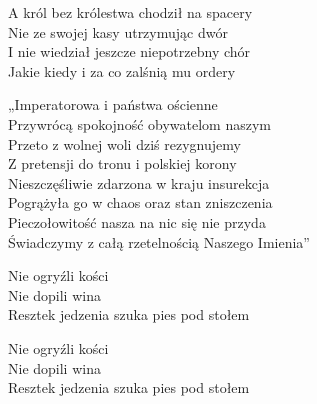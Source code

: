 \begin{text}
    \vin A król bez królestwa chodził na spacery\\
    \vin Nie ze swojej kasy utrzymując dwór\\
    \vin I nie wiedział jeszcze niepotrzebny chór\\
    \vin Jakie kiedy i za co zalśnią mu ordery

    „Imperatorowa i państwa ościenne\\
    Przywrócą spokojność obywatelom naszym\\
    Przeto z wolnej woli dziś rezygnujemy\\
    Z pretensji do tronu i polskiej korony\\
    Nieszczęśliwie zdarzona w kraju insurekcja\\
    Pogrążyła go w chaos oraz stan zniszczenia\\
    Pieczołowitość nasza na nic się nie przyda\\
    Świadczymy z całą rzetelnością Naszego Imienia”

    Nie ogryźli kości\\
    Nie dopili wina\\
    Resztek jedzenia szuka pies pod stołem

    Nie ogryźli kości\\
    Nie dopili wina\\
    Resztek jedzenia szuka pies pod stołem
\end{text}
